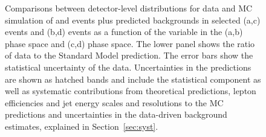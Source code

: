 \documentclass[cernpreprint,txfonts,UKenglish,texlive=2016]{\ATLASLATEXPATH atlasdoc}
\begin{document}
\begin{figure}
\begin{center}
	\end{center}
	\caption {Comparisons between detector-level distributions for data and MC simulation of \Znunu{} and \Zll{} events plus
          predicted backgrounds in selected (a,c) \ptmissjet{} events and (b,d) \lljet{} events as a function of the \ptmiss{}
          variable in the (a,b) \onejet{} phase space and (c,d) \vbf{} phase space. 
         The lower panel shows the ratio of data to the Standard Model prediction.
         The error bars show the statistical uncertainty of the data.
          Uncertainties in the predictions are shown as hatched bands and include
          the statistical component as well as systematic contributions from theoretical predictions, 
          lepton efficiencies and jet energy scales and resolutions to the MC predictions and uncertainties in
          the data-driven background estimates, explained in Section~\ref{sec:syst}.} 
  \label{fig:met-datamc}
\end{figure}
\end{document}
